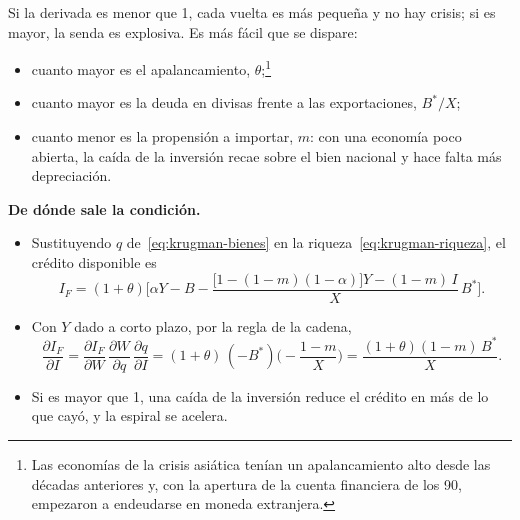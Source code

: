 \documentclass[11pt]{article}
\begin{document}
\begin{itemize}
  Si la derivada es menor que 1, cada vuelta es más pequeña y no hay crisis; si es mayor, la senda es explosiva. Es más fácil que se dispare:
  \begin{itemize}
  \item cuanto mayor es el apalancamiento, $\theta$;\footnote{Las economías de la crisis asiática tenían un apalancamiento alto desde las décadas anteriores y, con la apertura de la cuenta financiera de los 90, empezaron a endeudarse en moneda extranjera.}
  \item cuanto mayor es la deuda en divisas frente a las exportaciones, $B^{*}/X$;
  \item cuanto menor es la propensión a importar, $m$: con una economía poco abierta, la caída de la inversión recae sobre el bien nacional y hace falta más depreciación.
  \end{itemize}
\end{itemize}

\begin{infografia}[H]
\centering
\caption{La espiral de las hojas de balance}\label{figu:espiral-krugman}
\end{infografia}

\begin{anotaciones}
\textbf{De dónde sale la condición.}
\begin{itemize}
\item Sustituyendo $q$ de~\eqref{eq:krugman-bienes} en la riqueza~\eqref{eq:krugman-riqueza}, el crédito disponible es
  \[
  I_F=(1+\theta)\Big[\alpha Y-B-\frac{\bigl[1-(1-m)(1-\alpha)\bigr]Y-(1-m)\,I}{X}\,B^{*}\Big].
  \]
\item Con $Y$ dado a corto plazo, por la regla de la cadena,
  \[
  \frac{\partial I_F}{\partial I}=\frac{\partial I_F}{\partial W}\,\frac{\partial W}{\partial q}\,\frac{\partial q}{\partial I}=(1+\theta)\,(-B^{*})\Big(-\frac{1-m}{X}\Big)=\frac{(1+\theta)(1-m)\,B^{*}}{X}.
  \]
\item Si es mayor que 1, una caída de la inversión reduce el crédito en más de lo que cayó, y la espiral se acelera. \findemo
\end{itemize}
\end{anotaciones}
\end{document}
